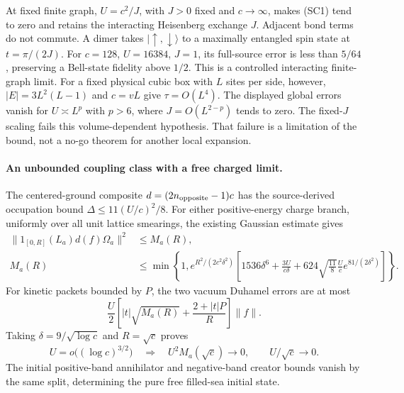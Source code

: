 At fixed finite graph, $U=c^2/J$, with $J>0$ fixed and $c\to\infty$,
makes (SC1) tend to zero and retains the interacting Heisenberg
exchange $J$. Adjacent bond terms do not commute. A dimer takes
$|\uparrow,\downarrow\rangle$ to a maximally entangled spin state at
$t=\pi/(2J)$. For $c=128$, $U=16384$, $J=1$, its full-source error
is less than $5/64$, preserving a Bell-state fidelity above $1/2$.
This is a controlled interacting finite-graph limit. For a fixed
physical cubic box with $L$ sites per side, however,
$|E|=3L^2(L-1)$ and $c=vL$ give $\tau=O(L^4)$.
The displayed global errors vanish for $U\asymp L^p$ with $p>6$,
where $J=O(L^{2-p})$ tends to zero. The fixed-$J$ scaling fails this
volume-dependent hypothesis. That failure is a limitation of the
bound, not a no-go theorem for another local expansion.

\paragraph{An unbounded coupling class with a free charged limit.}
The centered-ground composite $d=(2n_{\rm opposite}-1)c$ has the
source-derived occupation bound $\Delta\leq11(U/c)^2/8$.
For either positive-energy charge branch, uniformly over all unit
lattice smearings, the existing Gaussian estimate gives
\begin{align*}
 \|1_{[0,R]}(L_a)d(f)\Omega_a\|^2&\leq M_a(R),\\
 M_a(R)&\leq \min\left\{1,e^{R^2/(2c^2\delta^2)}
 \left[1536\delta^6+\frac{3U}{c\delta}
 +624\sqrt{\frac{11}{8}}\frac Uc e^{81/(2\delta^2)}\right]\right\}.
\end{align*}
For kinetic packets bounded by $P$, the two vacuum Duhamel errors
are at most
\[
 \frac U2\left[|t|\sqrt{M_a(R)}+
                       \frac{2+|t|P}{R}\right]\|f\|.
\]
Taking $\delta=9/\sqrt{\log c}$ and $R=\sqrt c$ proves
\[
 U=o\big((\log c)^{3/2}\big)
 \quad\Longrightarrow\quad U^2 M_a(\sqrt c)\to0,
 \qquad U/\sqrt c\to0.                                  \tag{SC2}
\]
The initial positive-band annihilator and negative-band creator
bounds vanish by the same split, determining the pure free
filled-sea initial state.

